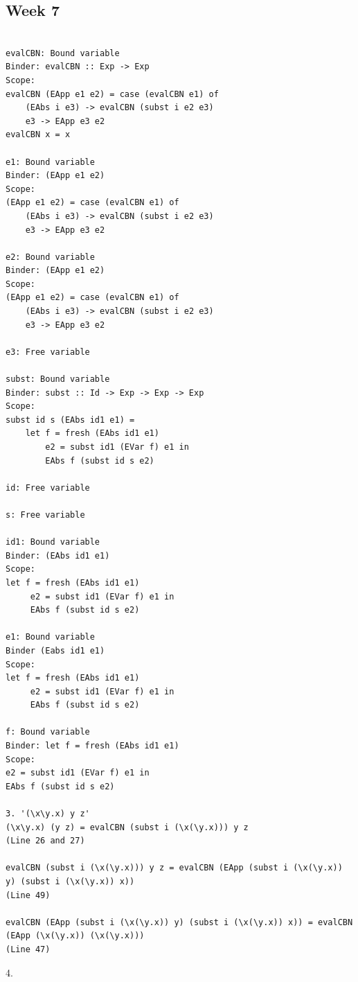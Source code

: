 \documentclass{article}
\theoremstyle{theorem}
\theoremstyle{definition}
\theoremstyle{remark}
\begin{document}
\subsection{Week 7}
\begin{verbatim}

evalCBN: Bound variable
Binder: evalCBN :: Exp -> Exp
Scope: 
evalCBN (EApp e1 e2) = case (evalCBN e1) of
    (EAbs i e3) -> evalCBN (subst i e2 e3)
    e3 -> EApp e3 e2
evalCBN x = x 

e1: Bound variable
Binder: (EApp e1 e2)
Scope: 
(EApp e1 e2) = case (evalCBN e1) of
    (EAbs i e3) -> evalCBN (subst i e2 e3)
    e3 -> EApp e3 e2

e2: Bound variable
Binder: (EApp e1 e2)
Scope: 
(EApp e1 e2) = case (evalCBN e1) of
    (EAbs i e3) -> evalCBN (subst i e2 e3)
    e3 -> EApp e3 e2

e3: Free variable

subst: Bound variable
Binder: subst :: Id -> Exp -> Exp -> Exp
Scope: 
subst id s (EAbs id1 e1) = 
    let f = fresh (EAbs id1 e1)
        e2 = subst id1 (EVar f) e1 in 
        EAbs f (subst id s e2)

id: Free variable

s: Free variable

id1: Bound variable
Binder: (EAbs id1 e1)
Scope: 
let f = fresh (EAbs id1 e1)
     e2 = subst id1 (EVar f) e1 in  
     EAbs f (subst id s e2)

e1: Bound variable
Binder (Eabs id1 e1)
Scope: 
let f = fresh (EAbs id1 e1)
     e2 = subst id1 (EVar f) e1 in 
     EAbs f (subst id s e2)

f: Bound variable
Binder: let f = fresh (EAbs id1 e1)
Scope: 
e2 = subst id1 (EVar f) e1 in 
EAbs f (subst id s e2)

3. '(\x\y.x) y z'
(\x\y.x) (y z) = evalCBN (subst i (\x(\y.x))) y z
(Line 26 and 27)

evalCBN (subst i (\x(\y.x))) y z = evalCBN (EApp (subst i (\x(\y.x)) y) (subst i (\x(\y.x)) x)) 
(Line 49)

evalCBN (EApp (subst i (\x(\y.x)) y) (subst i (\x(\y.x)) x)) = evalCBN (EApp (\x(\y.x)) (\x(\y.x))) 
(Line 47)

\end{verbatim}

4. 
\end{document}
